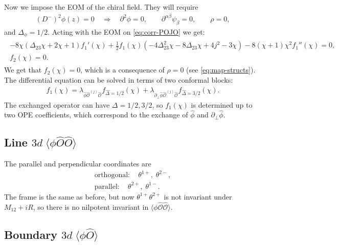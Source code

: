 \documentclass[letterpaper]{article}
\let\Oldsubsection\subsection
\renewcommand{\subsection}{\FloatBarrier\Oldsubsection}
\def\Om{{\mathcal{O}}}
\def\a{{\alpha}}
\def\b{{\beta}}
\begin{document}
Now we impose the EOM of the chiral field. They will require
\begin{align}
 (D^{-})^2 \phi(z) = 0 \quad \Rightarrow \quad
 \partial^2 \phi = 0, \qquad
 \partial^{\a\b} \psi_\b = 0, \qquad
 \rho = 0,
\end{align}
and $\Delta_\phi = 1/2$. Acting with the EOM on \eqref{eq:corr-POJO} we get:
\begin{align}
\begin{split}
 -8 \chi  (\Delta_{23} \chi +2 \chi +1) f_1'(\chi )+\frac{1}{2} f_1(\chi ) \left(-4 \Delta_{23}^2 \chi -8 \Delta_{23} \chi +4 j^2-3 \chi \right)-8 (\chi +1) \chi ^2 f_1''(\chi ) = 0, \\
 f_2(\chi) = 0.
\end{split}
\end{align}
We get that $f_2(\chi) = 0$, which is a consequence of $\rho = 0$ (see \eqref{eq:map-structs}). 
The differential equation can be solved in terms of two conformal blocks:
\begin{align}
 f_1(\chi) 
 = \lambda_{\hat \phi \hat \Om^{(j)} \hat \Om} f_{\hat \Delta = 1/2}(\chi)
 + \lambda_{\partial_\bot \hat \phi \hat \Om^{(j)} \hat \Om} f_{\hat \Delta = 3/2}(\chi).
\end{align}
The exchanged operator can have $\Delta = 1/2, 3/2$, so $f_1(\chi)$ is determined up to two OPE coefficients, which correspond to the exchange of $\hat \phi$ and $\partial_\bot \hat \phi$.


\subsection{Line \texorpdfstring{$3d \; \langle \phi \hat O \hat O \rangle$}{} }

The parallel and perpendicular coordinates are
\begin{align}
 \text{orthogonal}: \quad \theta^{1+}, \; \theta^{2-}, \\
 \text{parallel}:   \quad \theta^{2+}, \; \theta^{1-}.
\end{align}
The frame is the same as before, but now $\theta^{1+} \theta^{2+}$ is not invariant under $M_{12} + i R$, so there is no nilpotent invariant in $\langle \phi \hat \Om \hat \Om \rangle$.


\subsection{Boundary \texorpdfstring{$3d \; \langle \phi \hat O \rangle$}{} }
\end{document}
